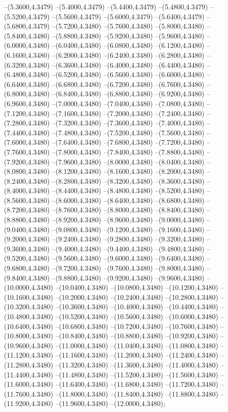 {	--(5.3600,4.3479)
	--(5.4000,4.3479)
	--(5.4400,4.3479)
	--(5.4800,4.3479)
	--(5.5200,4.3479)
	--(5.5600,4.3479)
	--(5.6000,4.3479)
	--(5.6400,4.3479)
	--(5.6800,4.3479)
	--(5.7200,4.3480)
	--(5.7600,4.3480)
	--(5.8000,4.3480)
	--(5.8400,4.3480)
	--(5.8800,4.3480)
	--(5.9200,4.3480)
	--(5.9600,4.3480)
	--(6.0000,4.3480)
	--(6.0400,4.3480)
	--(6.0800,4.3480)
	--(6.1200,4.3480)
	--(6.1600,4.3480)
	--(6.2000,4.3480)
	--(6.2400,4.3480)
	--(6.2800,4.3480)
	--(6.3200,4.3480)
	--(6.3600,4.3480)
	--(6.4000,4.3480)
	--(6.4400,4.3480)
	--(6.4800,4.3480)
	--(6.5200,4.3480)
	--(6.5600,4.3480)
	--(6.6000,4.3480)
	--(6.6400,4.3480)
	--(6.6800,4.3480)
	--(6.7200,4.3480)
	--(6.7600,4.3480)
	--(6.8000,4.3480)
	--(6.8400,4.3480)
	--(6.8800,4.3480)
	--(6.9200,4.3480)
	--(6.9600,4.3480)
	--(7.0000,4.3480)
	--(7.0400,4.3480)
	--(7.0800,4.3480)
	--(7.1200,4.3480)
	--(7.1600,4.3480)
	--(7.2000,4.3480)
	--(7.2400,4.3480)
	--(7.2800,4.3480)
	--(7.3200,4.3480)
	--(7.3600,4.3480)
	--(7.4000,4.3480)
	--(7.4400,4.3480)
	--(7.4800,4.3480)
	--(7.5200,4.3480)
	--(7.5600,4.3480)
	--(7.6000,4.3480)
	--(7.6400,4.3480)
	--(7.6800,4.3480)
	--(7.7200,4.3480)
	--(7.7600,4.3480)
	--(7.8000,4.3480)
	--(7.8400,4.3480)
	--(7.8800,4.3480)
	--(7.9200,4.3480)
	--(7.9600,4.3480)
	--(8.0000,4.3480)
	--(8.0400,4.3480)
	--(8.0800,4.3480)
	--(8.1200,4.3480)
	--(8.1600,4.3480)
	--(8.2000,4.3480)
	--(8.2400,4.3480)
	--(8.2800,4.3480)
	--(8.3200,4.3480)
	--(8.3600,4.3480)
	--(8.4000,4.3480)
	--(8.4400,4.3480)
	--(8.4800,4.3480)
	--(8.5200,4.3480)
	--(8.5600,4.3480)
	--(8.6000,4.3480)
	--(8.6400,4.3480)
	--(8.6800,4.3480)
	--(8.7200,4.3480)
	--(8.7600,4.3480)
	--(8.8000,4.3480)
	--(8.8400,4.3480)
	--(8.8800,4.3480)
	--(8.9200,4.3480)
	--(8.9600,4.3480)
	--(9.0000,4.3480)
	--(9.0400,4.3480)
	--(9.0800,4.3480)
	--(9.1200,4.3480)
	--(9.1600,4.3480)
	--(9.2000,4.3480)
	--(9.2400,4.3480)
	--(9.2800,4.3480)
	--(9.3200,4.3480)
	--(9.3600,4.3480)
	--(9.4000,4.3480)
	--(9.4400,4.3480)
	--(9.4800,4.3480)
	--(9.5200,4.3480)
	--(9.5600,4.3480)
	--(9.6000,4.3480)
	--(9.6400,4.3480)
	--(9.6800,4.3480)
	--(9.7200,4.3480)
	--(9.7600,4.3480)
	--(9.8000,4.3480)
	--(9.8400,4.3480)
	--(9.8800,4.3480)
	--(9.9200,4.3480)
	--(9.9600,4.3480)
	--(10.0000,4.3480)
	--(10.0400,4.3480)
	--(10.0800,4.3480)
	--(10.1200,4.3480)
	--(10.1600,4.3480)
	--(10.2000,4.3480)
	--(10.2400,4.3480)
	--(10.2800,4.3480)
	--(10.3200,4.3480)
	--(10.3600,4.3480)
	--(10.4000,4.3480)
	--(10.4400,4.3480)
	--(10.4800,4.3480)
	--(10.5200,4.3480)
	--(10.5600,4.3480)
	--(10.6000,4.3480)
	--(10.6400,4.3480)
	--(10.6800,4.3480)
	--(10.7200,4.3480)
	--(10.7600,4.3480)
	--(10.8000,4.3480)
	--(10.8400,4.3480)
	--(10.8800,4.3480)
	--(10.9200,4.3480)
	--(10.9600,4.3480)
	--(11.0000,4.3480)
	--(11.0400,4.3480)
	--(11.0800,4.3480)
	--(11.1200,4.3480)
	--(11.1600,4.3480)
	--(11.2000,4.3480)
	--(11.2400,4.3480)
	--(11.2800,4.3480)
	--(11.3200,4.3480)
	--(11.3600,4.3480)
	--(11.4000,4.3480)
	--(11.4400,4.3480)
	--(11.4800,4.3480)
	--(11.5200,4.3480)
	--(11.5600,4.3480)
	--(11.6000,4.3480)
	--(11.6400,4.3480)
	--(11.6800,4.3480)
	--(11.7200,4.3480)
	--(11.7600,4.3480)
	--(11.8000,4.3480)
	--(11.8400,4.3480)
	--(11.8800,4.3480)
	--(11.9200,4.3480)
	--(11.9600,4.3480)
	--(12.0000,4.3480);
}

